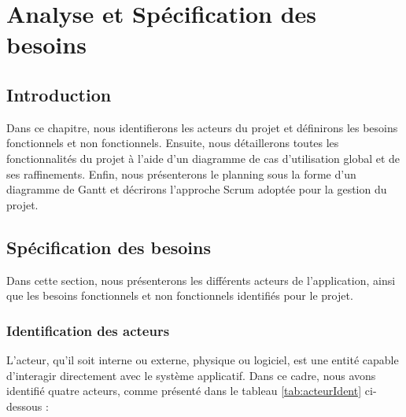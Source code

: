 \chapter{Analyse et Spécification des besoins}

\section*{Introduction}
Dans ce chapitre, nous identifierons les acteurs du projet et définirons les besoins fonctionnels et non fonctionnels. Ensuite, nous détaillerons toutes les fonctionnalités du projet à l'aide d'un diagramme de cas d'utilisation global et de ses raffinements. Enfin, nous présenterons le planning sous la forme d'un diagramme de Gantt et décrirons l'approche Scrum adoptée pour la gestion du projet.

\section{Spécification des besoins}
Dans cette section, nous présenterons les différents acteurs de l'application, ainsi que les besoins fonctionnels et non fonctionnels identifiés pour le projet.

\subsection{Identification des acteurs}
L'acteur, qu'il soit interne ou externe, physique ou logiciel, est une entité capable d'interagir directement avec le système applicatif. Dans ce cadre, nous avons identifié quatre acteurs, comme présenté dans le tableau \ref{tab:acteurIdent} ci-dessous :

